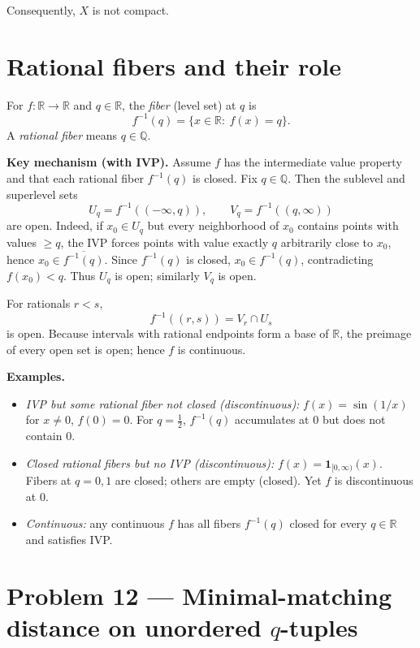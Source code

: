 \documentclass[12pt,a4paper]{article}
\theoremstyle{plain}
\theoremstyle{definition}
\theoremstyle{remark}
\theoremstyle{remark}
\begin{document}
\smallskip

Consequently, $X$ is not compact.

\section*{Rational fibers and their role}

For $f:\mathbb{R}\to\mathbb{R}$ and $q\in\mathbb{R}$, the \emph{fiber} (level set) at $q$ is
\[
f^{-1}(q)=\{x\in\mathbb{R}:\ f(x)=q\}.
\]
A \emph{rational fiber} means $q\in\mathbb{Q}$.

\smallskip

\noindent\textbf{Key mechanism (with IVP).}
Assume $f$ has the intermediate value property and that each rational fiber $f^{-1}(q)$ is closed.
Fix $q\in\mathbb{Q}$. Then the sublevel and superlevel sets
\[
U_q=f^{-1}((-\infty,q)),\qquad V_q=f^{-1}((q,\infty))
\]
are open. Indeed, if $x_0\in U_q$ but every neighborhood of $x_0$ contains points with values $\ge q$,
the IVP forces points with value exactly $q$ arbitrarily close to $x_0$, hence $x_0\in\overline{f^{-1}(q)}$.
Since $f^{-1}(q)$ is closed, $x_0\in f^{-1}(q)$, contradicting $f(x_0)<q$.
Thus $U_q$ is open; similarly $V_q$ is open.

\smallskip

For rationals $r<s$,
\[
f^{-1}((r,s))=V_r\cap U_s
\]
is open. Because intervals with rational endpoints form a base of $\mathbb{R}$,
the preimage of every open set is open; hence $f$ is continuous.

\bigskip

\noindent\textbf{Examples.}
\begin{itemize}
	\item \emph{IVP but some rational fiber not closed (discontinuous):}
	$f(x)=\sin(1/x)$ for $x\ne 0$, $f(0)=0$. For $q=\tfrac12$, $f^{-1}(q)$ accumulates at $0$ but does not contain $0$.
	\item \emph{Closed rational fibers but no IVP (discontinuous):}
	$f(x)=\mathbf{1}_{[0,\infty)}(x)$. Fibers at $q=0,1$ are closed; others are empty (closed). Yet $f$ is discontinuous at $0$.
	\item \emph{Continuous:} any continuous $f$ has all fibers $f^{-1}(q)$ closed for every $q\in\mathbb{R}$ and satisfies IVP.
\end{itemize}

\section*{Problem 12 — Minimal-matching distance on unordered $q$-tuples}
\end{document}
